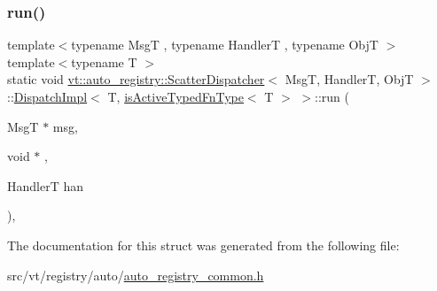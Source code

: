 \subsubsection{\texorpdfstring{run()}{run()}}
{\footnotesize\ttfamily template$<$typename MsgT , typename HandlerT , typename ObjT $>$ \\
template$<$typename T $>$ \\
static void \hyperlink{structvt_1_1auto__registry_1_1_scatter_dispatcher}{vt\+::auto\+\_\+registry\+::\+Scatter\+Dispatcher}$<$ MsgT, HandlerT, ObjT $>$\+::\hyperlink{structvt_1_1auto__registry_1_1_scatter_dispatcher_1_1_dispatch_impl}{Dispatch\+Impl}$<$ T, \hyperlink{structvt_1_1auto__registry_1_1_scatter_dispatcher_ab8e4df9baa8f4e9485c914dcb769e2ee}{is\+Active\+Typed\+Fn\+Type}$<$ T $>$ $>$\+::run (\begin{DoxyParamCaption}\item[{MsgT $\ast$}]{msg,  }\item[{void $\ast$}]{,  }\item[{HandlerT}]{han }\end{DoxyParamCaption})\hspace{0.3cm}{\ttfamily [inline]}, {\ttfamily [static]}}



The documentation for this struct was generated from the following file\+:\begin{DoxyCompactItemize}
\item 
src/vt/registry/auto/\hyperlink{auto__registry__common_8h}{auto\+\_\+registry\+\_\+common.\+h}\end{DoxyCompactItemize}
